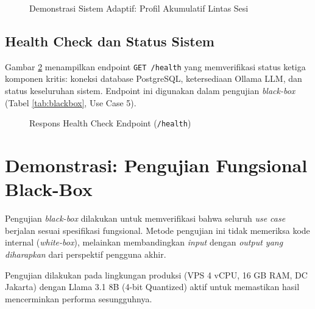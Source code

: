 \begin{figure}[H]
  \centering
  \caption{Demonstrasi Sistem Adaptif: Profil Akumulatif Lintas Sesi}
  \label{fig:ss_adaptif}
\end{figure}

\subsection{Health Check dan Status Sistem}

Gambar \ref{fig:ss_health} menampilkan endpoint \texttt{GET /health} yang memverifikasi
status ketiga komponen kritis: koneksi database PostgreSQL, ketersediaan Ollama LLM,
dan status keseluruhan sistem. Endpoint ini digunakan dalam pengujian \textit{black-box}
(Tabel \ref{tab:blackbox}, Use Case 5).

\begin{figure}[H]
  \centering
  \caption{Respons Health Check Endpoint (\texttt{/health})}
  \label{fig:ss_health}
\end{figure}

\section{Demonstrasi: Pengujian Fungsional Black-Box}

Pengujian \textit{black-box} dilakukan untuk memverifikasi bahwa seluruh \textit{use case}
berjalan sesuai spesifikasi fungsional. Metode pengujian ini tidak memeriksa kode
internal (\textit{white-box}), melainkan membandingkan \textit{input} dengan
\textit{output yang diharapkan} dari perspektif pengguna akhir.

Pengujian dilakukan pada lingkungan produksi (VPS 4 vCPU, 16 GB RAM, DC Jakarta)
dengan Llama 3.1 8B (4-bit Quantized) aktif untuk memastikan hasil mencerminkan performa sesungguhnya.

